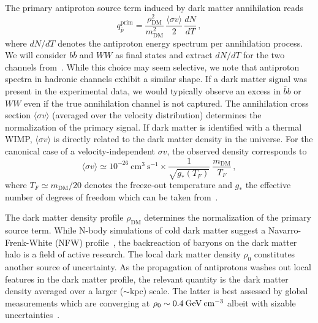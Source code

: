 \documentclass[a4paper,11pt]{article}
\newcommand{\eVdist}{\kern-0.06em}
\newcommand{\gev}{\:\text{Ge\eVdist V}}
\newcommand{\cm}{\:\text{cm}}
\newcommand{\s}{\:\text{s}}
\begin{document}
The primary antiproton source term induced by dark matter annihilation reads
\begin{equation}\label{eq:primary}
  q^\text{prim}_{\bar{p}}  =\frac{\rho_{\text{DM}}^2}{m_{\text{DM}}^2}\, 
\frac{\langle \sigma 
v\rangle}{2}\,\frac{dN}{dT}\,, 
\end{equation}
where $dN/dT$ denotes the antiproton energy spectrum per annihilation process. We will consider $b\bar{b}$ and $WW$ as final states and extract $dN/dT$ for the two channels from~\cite{Cirelli:2010xx}. While this choice may seem selective, we note that antiproton spectra in hadronic channels exhibit a similar shape. If a dark matter signal was present in the experimental data, we would typically observe an excess in $\bar{b}b$ or $WW$ even if the true annihilation channel is not captured. The annihilation cross section $\langle \sigma v\rangle$ (averaged over the velocity distribution) determines the normalization of the primary signal. If dark matter is identified with a thermal WIMP, $\langle \sigma v\rangle$ is directly related to the dark matter density in the universe. For the canonical case of a velocity-independent $\sigma v$, the observed density corresponds to~\cite{Drees:2009bi}
\begin{equation}\label{eq:relic}
  \langle \sigma v\rangle \simeq 
10^{-26}\cm^3\s^{-1}\times\frac{1}{\sqrt{g_*(T_F)}}\:\frac{m_{\text{DM}}}{T_F}\,, 
\end{equation} 
where $T_F\simeq m_{\text{DM}}/20$ denotes the freeze-out temperature and $g_*$ the effective number of degrees of freedom which can be taken from~\cite{Laine:2006cp}.

The dark matter density profile $\rho_{\text{DM}}$ determines the normalization of the primary source term. While N-body simulations of cold dark matter suggest a Navarro-Frenk-White (NFW) profile~\cite{Navarro:1995iw}, the backreaction of baryons on the dark matter halo is a field of active research. The local dark matter density $\rho_0$ constitutes another source of uncertainty. As the propagation of antiprotons washes out local features in the dark matter profile, the relevant quantity is the dark matter density averaged over a larger ($\sim$kpc) scale. The latter is best assessed by global measurements which are converging at $\rho_0\sim 0.4\gev\cm^{-3}$ albeit with sizable uncertainties~\cite{Catena:2009mf,Salucci:2010qr,Pato:2015dua,McMillan:2016}.
\end{document}
